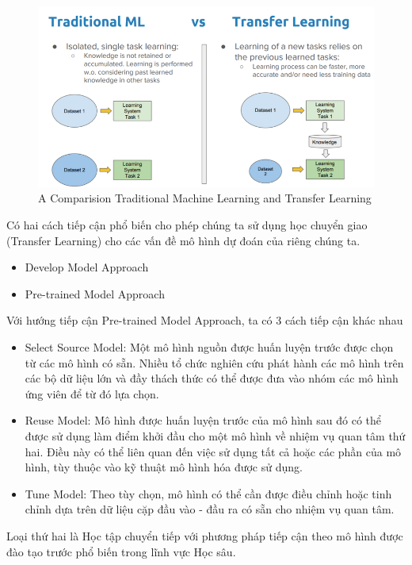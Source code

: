 \documentclass{article}
\begin{document}
	\begin{figure}[H]
		\centering
		\includegraphics[width=1\linewidth]{architecture/traditional_ml_transfer_learning.png}
		\caption{A Comparision Traditional Machine Learning and Transfer Learning}
		\label{fig:writing-thesis}
	\end{figure}
	Có hai cách tiếp cận phổ biến cho phép chúng ta sử dụng học chuyển giao (Transfer Learning) cho các vấn đề mô hình dự đoán của riêng chúng ta.
	\begin{itemize}
		\item Develop Model Approach
		\item Pre-trained Model Approach
	\end{itemize}
	Với hướng tiếp cận Pre-trained Model Approach, ta có 3 cách tiếp cận khác nhau
	\begin{itemize}
		\item Select Source Model: Một mô hình nguồn được huấn luyện trước được chọn từ các mô hình có sẵn. Nhiều tổ chức nghiên cứu phát hành các mô hình trên các bộ dữ liệu lớn và đầy thách thức có thể được đưa vào nhóm các mô hình ứng viên để từ đó lựa chọn.
		\item Reuse Model: Mô hình được huấn luyện  trước của mô hình sau đó có thể được sử dụng làm điểm khởi đầu cho một mô hình về nhiệm vụ quan tâm thứ hai. Điều này có thể liên quan đến việc sử dụng tất cả hoặc các phần của mô hình, tùy thuộc vào kỹ thuật mô hình hóa được sử dụng.
		\item Tune Model: Theo tùy chọn, mô hình có thể cần được điều chỉnh hoặc tinh chỉnh dựa trên dữ liệu cặp đầu vào - đầu ra có sẵn cho nhiệm vụ quan tâm.
	\end{itemize}
	
	Loại thứ hai là Học tập chuyển tiếp với phương pháp tiếp cận theo mô hình được đào tạo trước phổ biến trong lĩnh vực Học sâu.
	
\end{document}
